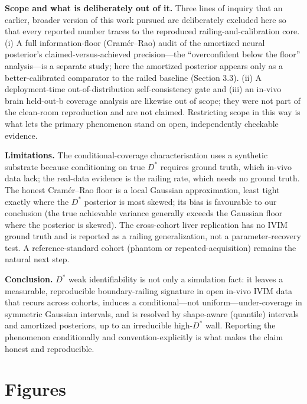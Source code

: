 \documentclass[11pt]{article}
\newcommand{\Dstar}{\ensuremath{D^{*}}}
\begin{document}
\textbf{Scope and what is deliberately out of it.} Three lines of inquiry that an earlier,
broader version of this work pursued are deliberately excluded here so that every reported
number traces to the reproduced railing-and-calibration core. (i) A full information-floor
(Cram\'er--Rao) audit of the amortized neural posterior's claimed-versus-achieved
precision---the ``overconfident below the floor'' analysis---is a separate study; here the
amortized posterior appears only as a better-calibrated comparator to the railed baseline
(Section 3.3). (ii) A deployment-time out-of-distribution self-consistency gate and (iii)
an in-vivo brain held-out-b coverage analysis are likewise out of scope; they were not
part of the clean-room reproduction and are not claimed. Restricting scope in this way is
what lets the primary phenomenon stand on open, independently checkable evidence.

\textbf{Limitations.} The conditional-coverage characterisation uses a synthetic substrate
because conditioning on true \Dstar{} requires ground truth, which in-vivo data lack; the
real-data evidence is the railing rate, which needs no ground truth. The honest
Cram\'er--Rao floor is a local Gaussian approximation, least tight exactly where the
\Dstar{} posterior is most skewed; its bias is favourable to our conclusion (the true
achievable variance generally exceeds the Gaussian floor where the posterior is skewed).
The cross-cohort liver replication has no IVIM ground truth and is reported as a railing
generalization, not a parameter-recovery test. A reference-standard cohort (phantom or
repeated-acquisition) remains the natural next step.

\textbf{Conclusion.} \Dstar{} weak identifiability is not only a simulation fact: it
leaves a measurable, reproducible boundary-railing signature in open in-vivo IVIM data
that recurs across cohorts, induces a conditional---not uniform---under-coverage in
symmetric Gaussian intervals, and is resolved by shape-aware (quantile) intervals and
amortized posteriors, up to an irreducible high-\Dstar{} wall. Reporting the phenomenon
conditionally and convention-explicitly is what makes the claim honest and reproducible.

\section*{Figures}
\end{document}

